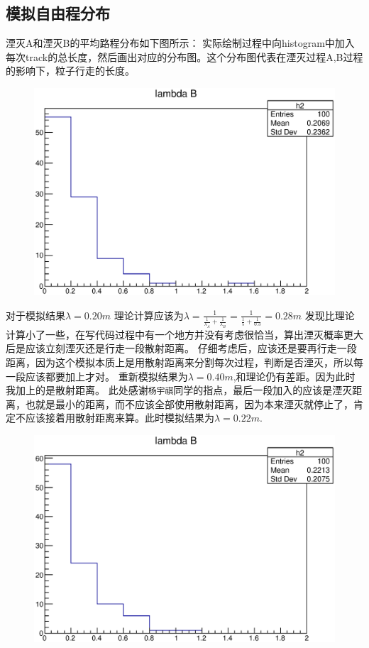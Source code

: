 \documentclass[UTF8]{ctexart}
\begin{document}
\subsection{模拟自由程分布}
湮灭A和湮灭B的平均路程分布如下图所示：
实际绘制过程中向histogram中加入每次track的总长度，然后画出对应的分布图。这个分布图代表在湮灭过程A,B过程的影响下，粒子行走的长度。
\begin{figure}[h]
\includegraphics[width=.8\textwidth]{distribution100.eps}
\end{figure}
对于模拟结果$\lambda=0.20m$
理论计算应该为$\lambda=\frac{1}{\frac{1}{\lambda_A}+\frac{1}{\lambda_B}}=\frac{1}{\frac{1}{5}+\frac{1}{0.3}}=0.28m$
发现比理论计算小了一些，在写代码过程中有一个地方并没有考虑很恰当，算出湮灭概率更大后是应该立刻湮灭还是行走一段散射距离。
仔细考虑后，应该还是要再行走一段距离，因为这个模拟本质上是用散射距离来分割每次过程，判断是否湮灭，所以每一段应该都要加上才对。
重新模拟结果为$\lambda=0.40m$,和理论仍有差距。因为此时我加上的是散射距离。
此处感谢\texttt{杨宇祺}同学的指点，最后一段加入的应该是湮灭距离，也就是最小的距离，而不应该全部使用散射距离，因为本来湮灭就停止了，肯定不应该接着用散射距离来算。此时模拟结果为$\lambda=0.22m$.
\begin{figure}[h]
\includegraphics[width=.8\textwidth]{distributionN100.eps}
\end{figure}
\end{document}
